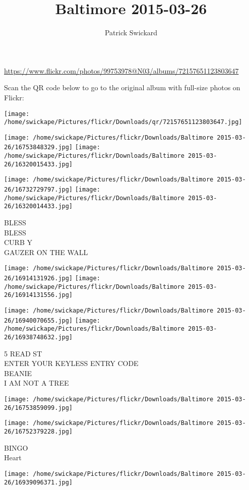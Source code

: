 \documentclass[10pt,letterpaper]{article}
\title{Baltimore 2015-03-26}
\author{Patrick Swickard}
\date{}
\begin{document}
\maketitle

\url{https://www.flickr.com/photos/99753978@N03/albums/72157651123803647}

Scan the QR code below to go to the original album with full-size photos on Flickr:

\texttt{[image: /home/swickape/Pictures/flickr/Downloads/qr/72157651123803647.jpg]}
\pagebreak

\texttt{[image: /home/swickape/Pictures/flickr/Downloads/Baltimore 2015-03-26/16753848329.jpg]}
\texttt{[image: /home/swickape/Pictures/flickr/Downloads/Baltimore 2015-03-26/16320015433.jpg]}

\texttt{[image: /home/swickape/Pictures/flickr/Downloads/Baltimore 2015-03-26/16732729797.jpg]}
\texttt{[image: /home/swickape/Pictures/flickr/Downloads/Baltimore 2015-03-26/16320014433.jpg]}

BLESS\\
BLESS\\
CURB Y\\
GAUZER ON THE WALL
\pagebreak

\texttt{[image: /home/swickape/Pictures/flickr/Downloads/Baltimore 2015-03-26/16914131926.jpg]}
\texttt{[image: /home/swickape/Pictures/flickr/Downloads/Baltimore 2015-03-26/16914131556.jpg]}

\texttt{[image: /home/swickape/Pictures/flickr/Downloads/Baltimore 2015-03-26/16940070655.jpg]}
\texttt{[image: /home/swickape/Pictures/flickr/Downloads/Baltimore 2015-03-26/16938748632.jpg]}

5 READ ST\\
ENTER YOUR KEYLESS ENTRY CODE\\
BEANIE\\
I AM NOT A TREE
\pagebreak

\texttt{[image: /home/swickape/Pictures/flickr/Downloads/Baltimore 2015-03-26/16753859099.jpg]}

\vspace{0.25in}
\texttt{[image: /home/swickape/Pictures/flickr/Downloads/Baltimore 2015-03-26/16752379228.jpg]}

BINGO\\
Heart
\pagebreak

\texttt{[image: /home/swickape/Pictures/flickr/Downloads/Baltimore 2015-03-26/16939096371.jpg]}
\end{document}
